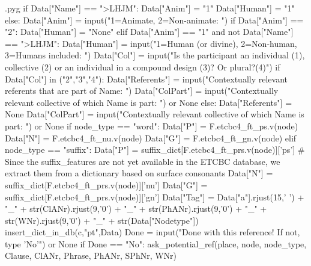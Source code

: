 \documentclass{report}
\makeatletter
\newenvironment{python}{%
  \VerbatimEnvironment
  \minted@resetoptions
  \setkeys{minted@opt}{}
      \begin{VerbatimOut}{\jobname.pyg}}
{%
      \end{VerbatimOut}
      \minted@pygmentize{python}
      \DeleteFile{\jobname.pyg}}
\makeatother
\begin{document}
\begin{python}
        if Data["Name"] == ">LHJM":
            Data["Anim"] = "1"
            Data["Human"] = "1"
        else:
            Data["Anim"] = input("1=Animate, 2=Non-animate: ")
        if Data["Anim"] == "2":
            Data["Human"] = "None"
        elif Data["Anim"] == "1" and not Data["Name"] == ">LHJM":
            Data["Human"] = input("1=Human (or divine), 2=Non-human, 3=Humans included: ")
        Data["Col"] = input("Is the participant an individual (1), collective (2) or an individual in a compound design (3)? Or plural?(4)")
        if Data["Col"] in ("2","3","4"):
            Data["Referents"] = input("Contextually relevant referents that are part of Name: ")
            Data["ColPart"] = input("Contextually relevant collective of which Name is part: ") or None
        else:
            Data["Referents"] = None
            Data["ColPart"] = input("Contextually relevant collective of which Name is part: ") or None
        if node_type == "word":
            Data["P"] = F.etcbc4_ft_ps.v(node)
            Data["N"] = F.etcbc4_ft_nu.v(node)
            Data["G"] = F.etcbc4_ft_gn.v(node)
        elif node_type == "suffix":
            Data["P"] = suffix_dict[F.etcbc4_ft_prs.v(node)]['ps']    # Since the suffix_features are not yet available in the ETCBC database, we extract them from a dictionary based on surface consonants
            Data["N"] = suffix_dict[F.etcbc4_ft_prs.v(node)]['nu']
            Data["G"] = suffix_dict[F.etcbc4_ft_prs.v(node)]['gn']
        Data["Tag"] = Data["a"].rjust(15,' ') + "_" + str(ClANr).rjust(9,'0') + "_" + str(PhANr).rjust(9,'0') + "_" + str(WNr).rjust(9,'0') + "_" + str(Data["Nodetype"])
        insert_dict_in_db(c,"pt",Data)
        Done = input("Done with this reference! If not, type 'No'") or None
        if Done == "No":
            ask_potential_ref(place, node, node_type, Clause, ClANr, Phrase, PhANr, SPhNr, WNr)

\end{python}
\end{document}
